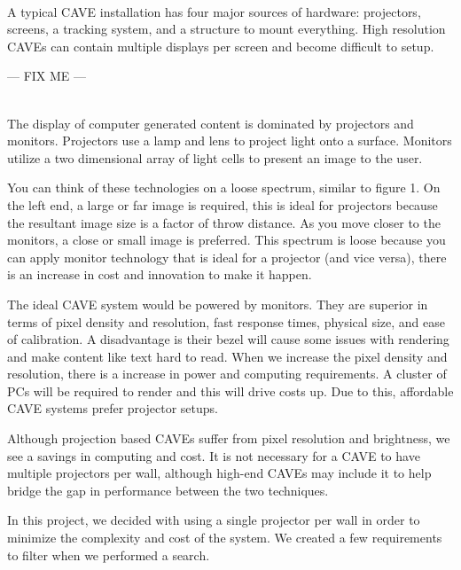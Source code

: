 \label{chapter:hardwareChapter}

\\

A typical CAVE installation has four major sources of hardware: projectors, screens, a tracking system, and a structure to mount everything. High resolution CAVEs can contain multiple displays per screen and become difficult to setup.

--- FIX ME ---


\label{sec:hwProjectorsSection}\\

The display of computer generated content is dominated by projectors and monitors. Projectors use a lamp and lens to project light onto a surface. Monitors utilize a two dimensional array of light cells to present an image to the user.

You can think of these technologies on a loose spectrum, similar to figure 1. On the left end, a large or far image is required, this is ideal for projectors because the resultant image size is a factor of throw distance. As you move closer to the monitors, a close or small image is preferred. This spectrum is loose because you can apply monitor technology that is ideal for a projector (and vice versa), there is an increase in cost and innovation to make it happen.

The ideal CAVE system would be powered by monitors. They are superior in terms of pixel density and resolution, fast response times, physical size, and ease of calibration. A disadvantage is their bezel will cause some issues with rendering and make content like text hard to read. When we increase the pixel density and resolution, there is a increase in power and computing requirements. A cluster of PCs will be required to render and this will drive costs up. Due to this, affordable CAVE systems prefer projector setups.

Although projection based CAVEs suffer from pixel resolution and brightness, we see a savings in computing and cost. It is not necessary for a CAVE to have multiple projectors per wall, although high-end CAVEs may include it to help bridge the gap in performance between the two techniques.

In this project, we decided with using a single projector per wall in order to minimize the complexity and cost of the system. We created a few requirements to filter when we performed a search.

